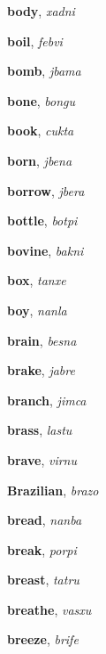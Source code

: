 \documentclass[12pt]{book}
\begin{document}
\begin{description}
\item[ ] \textbf{body}, \textit{xadni}

\item[ ] \textbf{boil}, \textit{febvi}

\item[ ] \textbf{bomb}, \textit{jbama}

\item[ ] \textbf{bone}, \textit{bongu}

\item[ ] \textbf{book}, \textit{cukta}

\item[ ] \textbf{born}, \textit{jbena}

\item[ ] \textbf{borrow}, \textit{jbera}

\item[ ] \textbf{bottle}, \textit{botpi}

\item[ ] \textbf{bovine}, \textit{bakni}

\item[ ] \textbf{box}, \textit{tanxe}

\item[ ] \textbf{boy}, \textit{nanla}

\item[ ] \textbf{brain}, \textit{besna}

\item[ ] \textbf{brake}, \textit{jabre}

\item[ ] \textbf{branch}, \textit{jimca}

\item[ ] \textbf{brass}, \textit{lastu}

\item[ ] \textbf{brave}, \textit{virnu}

\item[ ] \textbf{Brazilian}, \textit{brazo}

\item[ ] \textbf{bread}, \textit{nanba}

\item[ ] \textbf{break}, \textit{porpi}

\item[ ] \textbf{breast}, \textit{tatru}

\item[ ] \textbf{breathe}, \textit{vasxu}

\item[ ] \textbf{breeze}, \textit{brife}


\end{description}
\end{document}
